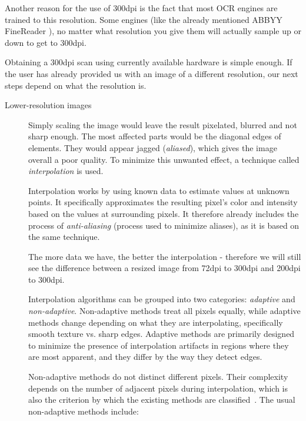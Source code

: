Another reason for the use of 300dpi is the fact that most OCR engines are trained to this resolution. Some engines (like the already mentioned ABBYY FineReader \citep{ABBYYdpi}), no matter what resolution you give them will actually sample up or down to get to 300dpi. 

Obtaining a 300dpi scan using currently available hardware is simple enough. If the user has already provided us with an image of a different resolution, our next steps depend on what the resolution is.

\begin{description}
\item[Lower-resolution images]  Simply scaling the image would leave the result pixelated, blurred and not sharp enough. The most affected parts would be the diagonal edges of elements. They would appear jagged (\emph{aliased}), which gives the image overall a poor quality. To minimize this unwanted effect, a technique called \emph{interpolation} is used.

Interpolation works by using known data to estimate values at unknown points. It specifically approximates the resulting pixel's color and intensity based on the values at surrounding pixels. It therefore already includes the process of \emph{anti-aliasing} (process used to minimize aliases), as it is based on the same technique.

The more data we have, the better the interpolation - therefore we will still see the difference between a resized image from 72dpi to 300dpi and 200dpi to 300dpi.

Interpolation algorithms can be grouped into two categories: \emph{adaptive} and \emph{non-adaptive}. Non-adaptive methods treat all pixels equally, while adaptive methods change depending on what they are interpolating, specifically smooth texture vs. sharp edges. Adaptive methods are primarily designed to minimize the presence of interpolation artifacts in regions where they are most apparent, and they differ by the way they detect edges.

Non-adaptive methods do not distinct  different pixels. Their complexity depends on the number of adjacent pixels during interpolation, which is also the criterion by which the existing methods are classified~\cite{interpolation}.  The usual non-adaptive methods include:


\end{description}
